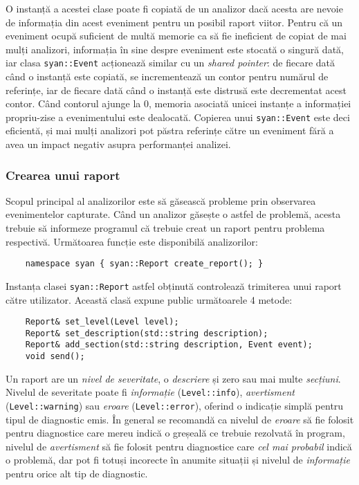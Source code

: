 O instanță a acestei clase poate fi copiată de un analizor dacă
acesta are nevoie de informația din acest eveniment pentru un posibil
raport viitor. Pentru că un eveniment ocupă suficient de multă memorie
ca să fie ineficient de copiat de mai mulți analizori, informația în
sine despre eveniment este stocată o singură dată, iar clasa
\lstinline{syan::Event} acționează similar cu un
\textit{shared pointer}\cite{SharedPtr}: de fiecare dată când o instanță
este copiată, se incrementează un contor pentru numărul de referințe,
iar de fiecare dată când o instanță este distrusă este decrementat acest
contor. Când contorul ajunge la 0, memoria asociată unicei instanțe a
informației propriu-zise a evenimentului este dealocată. Copierea unui
\lstinline{syan::Event} este deci eficientă, și mai mulți analizori pot
păstra referințe către un eveniment fără a avea un impact negativ asupra
performanței analizei.

\subsubsection{Crearea unui raport}

Scopul principal al analizorilor este să găsească probleme prin
observarea evenimentelor capturate. Când un analizor găsește o astfel de
problemă, acesta trebuie să informeze programul că trebuie creat un
raport pentru problema respectivă. Următoarea funcție este disponibilă
analizorilor:
\begin{lstlisting}
    namespace syan { syan::Report create_report(); }
\end{lstlisting}
Instanța clasei \lstinline{syan::Report} astfel obținută controlează
trimiterea unui raport către utilizator. Această clasă expune public
următoarele 4 metode:
\begin{lstlisting}
    Report& set_level(Level level);
    Report& set_description(std::string description);
    Report& add_section(std::string description, Event event);
    void send();
\end{lstlisting}
Un raport are un \textit{nivel de severitate}, o \textit{descriere} și
zero sau mai multe \textit{secțiuni}. Nivelul de severitate poate fi
\textit{informație} (\lstinline{Level::info}), \textit{avertisment}
(\lstinline{Level::warning}) sau \textit{eroare}
(\lstinline{Level::error}), oferind o indicație simplă pentru tipul de
diagnostic emis. În general se recomandă ca nivelul de \textit{eroare}
să fie folosit pentru diagnostice care mereu indică o greșeală ce
trebuie rezolvată în program, nivelul de \textit{avertisment} să fie
folosit pentru diagnostice care \textit{cel mai probabil} indică o
problemă, dar pot fi totuși incorecte în anumite situații și nivelul de
\textit{informație} pentru orice alt tip de diagnostic.

